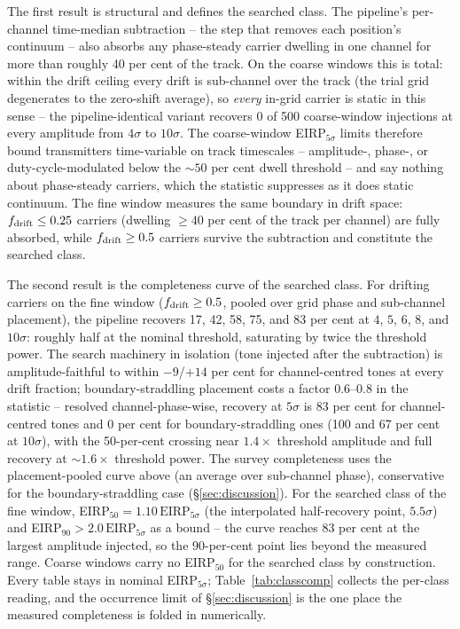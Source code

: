 \documentclass{openjournal}
\begin{document}
The first result is structural and defines the searched class. The
pipeline's per-channel time-median subtraction -- the step that
removes each position's continuum -- also absorbs any phase-steady
carrier dwelling in one channel for more than roughly 40 per cent of
the track. On the coarse windows this is total: within the drift
ceiling every drift is sub-channel over the track (the trial grid
degenerates to the zero-shift average), so \emph{every} in-grid
carrier is static in this sense -- the pipeline-identical variant
recovers 0 of 500 coarse-window injections at every amplitude from
$4\sigma$ to $10\sigma$. The coarse-window EIRP$_{5\sigma}$ limits
therefore bound transmitters time-variable on track timescales --
amplitude-, phase-, or duty-cycle-modulated below the ${\sim}50$ per
cent dwell threshold -- and say nothing about phase-steady carriers,
which the statistic suppresses as it does static continuum. The fine
window measures the same boundary in drift space:
$f_{\rm drift}\leq0.25$ carriers (dwelling ${\geq}40$ per cent of the
track per channel) are fully absorbed, while $f_{\rm drift}\geq0.5$
carriers survive the subtraction and constitute the searched class.

The second result is the completeness curve of the searched class.
For drifting carriers on the fine window ($f_{\rm drift}\geq0.5$,
pooled over grid phase and sub-channel placement), the pipeline
recovers 17, 42, 58, 75, and 83 per cent at $4$, $5$, $6$, $8$, and
$10\sigma$: roughly half at the nominal threshold, saturating by
twice the threshold power. The search machinery in isolation (tone
injected after the subtraction) is amplitude-faithful to within
$-9$/$+14$ per cent for channel-centred tones at every drift
fraction; boundary-straddling placement costs a factor $0.6$--$0.8$
in the statistic -- resolved channel-phase-wise, recovery at $5\sigma$
is 83 per cent for channel-centred tones and 0 per cent for
boundary-straddling ones (100 and 67 per cent at $10\sigma$), with
the 50-per-cent crossing near $1.4\times$ threshold amplitude and
full recovery at ${\sim}1.6\times$ threshold power. The survey
completeness uses the placement-pooled curve above (an average over
sub-channel phase), conservative for the boundary-straddling case
(\S\ref{sec:discussion}). For the searched class of the fine window,
EIRP$_{50} = 1.10\,\mathrm{EIRP}_{5\sigma}$ (the interpolated
half-recovery point, $5.5\sigma$) and
EIRP$_{90} > 2.0\,\mathrm{EIRP}_{5\sigma}$ as a bound -- the curve
reaches 83 per cent at the largest amplitude injected, so the
90-per-cent point lies beyond the measured range. Coarse windows
carry no EIRP$_{50}$ for the searched class by construction. Every
table stays in nominal EIRP$_{5\sigma}$; Table~\ref{tab:classcomp}
collects the per-class reading, and the occurrence limit of
\S\ref{sec:discussion} is the one place the measured completeness is
folded in numerically.
\end{document}
